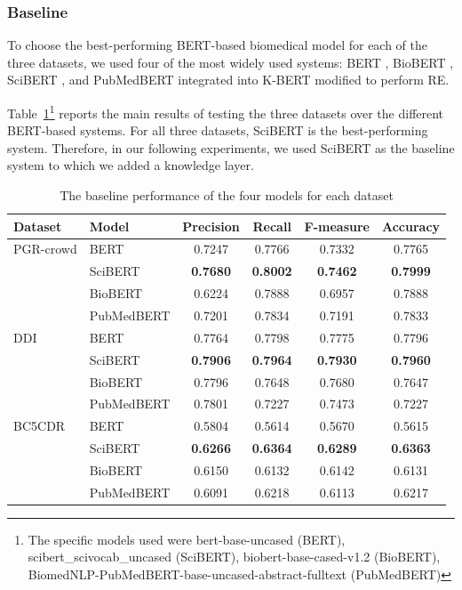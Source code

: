 \subsubsection{Baseline}

To choose the best-performing BERT-based biomedical model for each of the three datasets, we used four of the most widely used systems: BERT \citep{devlin2019bert}, BioBERT \citep{lee2020biobert}, SciBERT \citep{scibert}, and PubMedBERT \citep{gu2021domain} integrated into K-BERT \citep{liu2020k} modified to perform RE. 

Table~\ref{Tab:03}\footnote{The specific models used were bert-base-uncased (BERT), scibert\_scivocab\_uncased (SciBERT), biobert-base-cased-v1.2 (BioBERT), BiomedNLP-PubMedBERT-base-uncased-abstract-fulltext (PubMedBERT)} reports the main results of testing the three datasets over the different BERT-based systems. For all three datasets, SciBERT is the best-performing system. Therefore, in our following experiments, we used SciBERT as the baseline system to which we added a knowledge layer.  

\begin{table}[h]
\centering
\caption[Baseline Performance of the Four Models for Each Dataset]{The baseline performance of the four models for each dataset\label{Tab:03}} 
\begin{tabular}{@{}llcccc@{}}\hline
Dataset & Model & Precision & Recall & F-measure & Accuracy\\\hline
PGR-crowd & BERT & 0.7247 & 0.7766 & 0.7332 & 0.7765\\
& SciBERT & \textbf{0.7680} & \textbf{0.8002} & \textbf{0.7462} & \textbf{0.7999}\\
& BioBERT & 0.6224 & 0.7888 & 0.6957 & 0.7888\\
& PubMedBERT & 0.7201 & 0.7834 & 0.7191 & 0.7833\\\hline
DDI & BERT & 0.7764 & 0.7798 & 0.7775 & 0.7796\\
& SciBERT & \textbf{0.7906} & \textbf{0.7964} & \textbf{0.7930} & \textbf{0.7960}\\
& BioBERT & 0.7796 & 0.7648 & 0.7680 & 0.7647\\
& PubMedBERT & 0.7801 & 0.7227 & 0.7473 & 0.7227\\\hline
BC5CDR & BERT & 0.5804 & 0.5614 & 0.5670 & 0.5615\\
& SciBERT & \textbf{0.6266} & \textbf{0.6364} & \textbf{0.6289} & \textbf{0.6363}\\
& BioBERT & 0.6150 & 0.6132 & 0.6142 & 0.6131\\
& PubMedBERT & 0.6091 & 0.6218 & 0.6113 & 0.6217\\\hline
\end{tabular}
\end{table}


